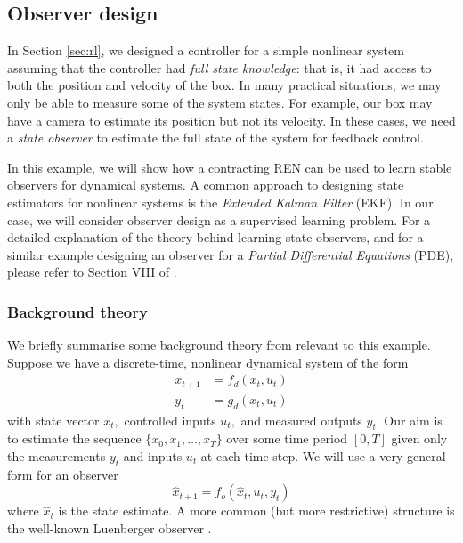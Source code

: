 \subsection{Observer design} \label{sec:observer}

In Section \ref{sec:rl}, we designed a controller for a simple nonlinear system assuming that the controller had \textit{full state knowledge}: that is, it had access to both the position and velocity of the box. In many practical situations, we may only be able to measure some of the system states. For example, our box may have a camera to estimate its position but not its velocity. In these cases, we need a \textit{state observer} to estimate the full state of the system for feedback control.

In this example, we will show how a contracting REN can be used to learn stable observers for dynamical systems. A common approach to designing state estimators for nonlinear systems is the \textit{Extended Kalman Filter} (EKF). In our case, we will consider observer design as a supervised learning problem. For a detailed explanation of the theory behind learning state observers, and for a similar example designing an observer for a \textit{Partial Differential Equations} (PDE), please refer to Section VIII of \cite{Revay++2021b}.

\subsubsection{Background theory} \label{sec:observer-theory}

We briefly summarise some background theory from \cite{Revay++2021b} relevant to this example. Suppose we have a discrete-time, nonlinear dynamical system of the form
\begin{align}
    x_{t+1} &= f_d(x_t, u_t) \\
    y_t &= g_d(x_t, u_t)
\end{align}
with state vector $x_t,$ controlled inputs $u_t,$ and measured outputs $y_t.$ Our aim is to estimate the sequence $\{x_0, x_1, \ldots, x_T \}$ over some time period $[0,T]$ given only the measurements $y_t$ and inputs $u_t$ at each time step. We will use a very general form for an observer
\begin{equation}
    \hat{x}_{t+1} = f_o(\hat{x}_t, u_t, y_t)
\end{equation}
where $\hat{x}_t$ is the state estimate. A more common (but more restrictive) structure is the well-known Luenberger observer \cite{Luenberger1971}.

